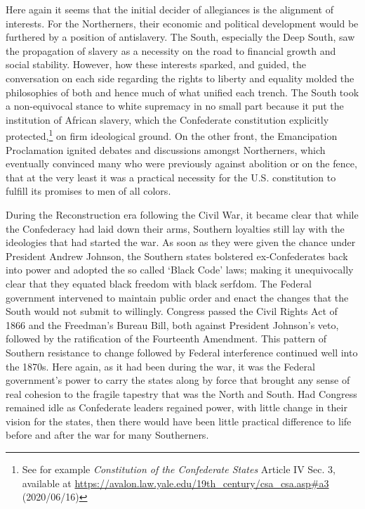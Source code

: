\documentclass[a4paper]{article}
\begin{document}
Here again it seems that the initial decider of allegiances is the alignment of interests. For the Northerners, their economic and political development would be furthered by a position of antislavery. The South, especially the Deep South, saw the propagation of slavery as a necessity on the road to financial growth and social stability. However, how these interests sparked, and guided, the conversation on each side regarding the rights to liberty and equality molded the philosophies of both and hence much of what unified each trench. The South took a non-equivocal stance to white supremacy in no small part because it put the institution of African slavery, which the Confederate constitution explicitly protected,\footnote{See for example \textit{Constitution of the Confederate States} Article IV Sec. 3, available at \url{https://avalon.law.yale.edu/19th_century/csa_csa.asp#a3} (2020/06/16)} on firm ideological ground. On the other front, the Emancipation Proclamation ignited  debates and discussions amongst Northerners, which eventually convinced many who were previously against abolition or on the fence, that at the very least it was a practical necessity for the U.S. constitution to fulfill its promises to men of all colors.  

During the Reconstruction era following the Civil War, it became clear that while the Confederacy had laid down their arms, Southern loyalties still lay with the ideologies that had started the war. As soon as they were given the chance under President Andrew Johnson, the Southern states bolstered ex-Confederates back into power and adopted the so called ‘Black Code’ laws; making it unequivocally clear that they equated black freedom with black serfdom. The Federal government intervened to maintain public order and enact the changes that the South would not submit to willingly. Congress passed the Civil Rights Act of 1866 and the Freedman’s Bureau Bill, both against President Johnson's veto, followed by the ratification of the Fourteenth Amendment. This pattern of Southern resistance to change followed by Federal interference continued well into the 1870s.\autocite[pp. 531-559]{AmericanRep1} Here again, as it had been during the war, it was the Federal government’s power to carry the states along by force that brought any sense of real cohesion to the fragile tapestry that was the North and South. Had Congress remained idle as Confederate leaders regained power, with little change in their vision for the states, then there would have been little practical difference to life before and after the war for many Southerners.  
\end{document}
